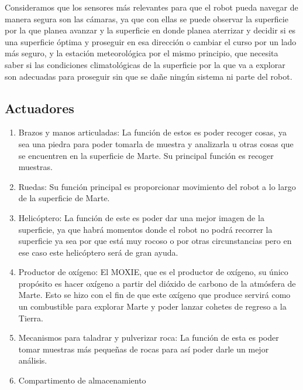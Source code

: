 \documentclass{article}
\begin{document}
        Consideramos que los sensores más relevantes para que el robot pueda navegar de manera segura son las cámaras, ya que con ellas se puede observar la superficie por la que planea avanzar y la superficie en donde planea aterrizar y decidir si es una superficie óptima y proseguir en esa dirección o cambiar el curso por un lado más seguro, y la estación meteorológica por el mismo principio, que necesita saber si las condiciones climatológicas de la superficie por la que va a explorar son adecuadas para proseguir sin que se dañe ningún sistema ni parte del robot.

        \subsection{Actuadores}
            \begin{enumerate}
                \item Brazos y manos articuladas: La función de estos es poder recoger cosas, ya sea una piedra para poder tomarla de muestra y analizarla u otras cosas que se encuentren en la superficie de Marte. Su principal función es recoger muestras. 
                \item Ruedas: Su función principal es proporcionar movimiento del robot a lo largo de la superficie de Marte.
                \item Helicóptero: La función de este es poder dar una mejor imagen de la superficie, ya que habrá momentos donde el robot no podrá recorrer la superficie ya sea por que está muy rocoso o por otras circunstancias pero en ese caso este helicóptero será de gran ayuda. 
                \item Productor de oxígeno: El MOXIE, que es el productor de oxígeno, su único propósito es hacer oxígeno a partir del dióxido de carbono de la atmósfera de Marte. Esto se hizo con el fin de que este oxígeno que produce servirá como un combustible para explorar Marte y poder lanzar cohetes de regreso a la Tierra.
                \item Mecanismos para taladrar y pulverizar roca: La función de esta es poder tomar muestras más pequeñas de rocas para así poder darle un mejor análisis. 
                \item Compartimento de almacenamiento
            \end{enumerate}
\end{document}
